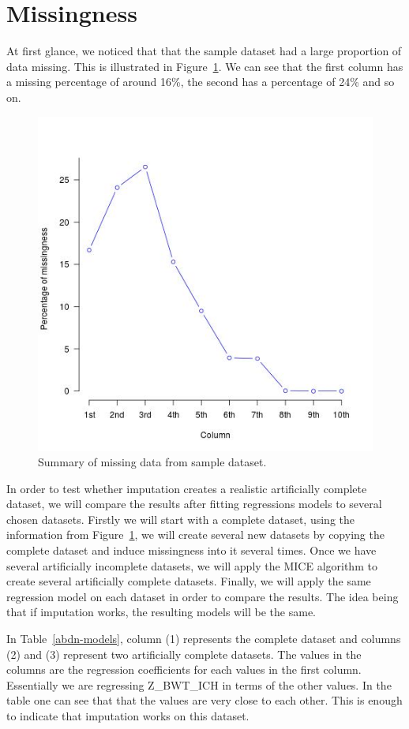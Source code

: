 \documentclass[bsc]{abdnthesis}
\begin{document}
\section{Missingness} %
\label{sec:missingness}
At first glance, we noticed that that the sample dataset had a large proportion of data missing. This is illustrated in Figure~\ref{missing-data}. We can see that the first column has a missing percentage of around 16\%, the second has a percentage of 24\% and so on. 
\begin{figure}[h]
  \centering
    \includegraphics[width=0.85 \textwidth]{eqmiss}
  \caption{Summary of missing data from sample dataset.}
  \label{missing-data}
\end{figure}

In order to test whether imputation creates a realistic artificially complete dataset, we will compare the results after fitting regressions models to several chosen datasets. Firstly we will start with a complete dataset, using the information from Figure~\ref{missing-data}, we will create several new datasets by copying the complete dataset and induce missingness into it several times. Once we have several artificially incomplete datasets, we will apply the MICE algorithm to create several artificially complete datasets. Finally, we will apply the same regression model on each dataset in order to compare the results. The idea being that if imputation works, the resulting models will be the same. 

 In Table~\ref{abdn-models}, column (1) represents the complete dataset and columns (2) and (3) represent two artificially complete datasets. The values in the columns are the regression coefficients for each values in the first column. Essentially we are regressing Z\_BWT\_ICH in terms of the other values. In the table one can see that that the values are very close to each other. This is enough to indicate that imputation works on this dataset.
\end{document}
